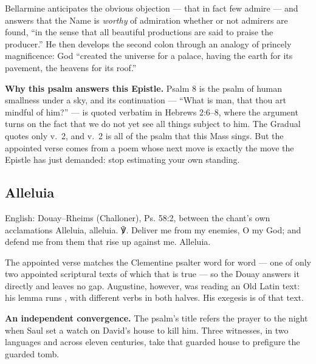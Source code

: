 \begin{witnessnote}
Bellarmine anticipates the obvious objection --- that in fact few admire ---
and answers that the Name is \textit{worthy} of admiration whether or not
admirers are found, ``in the sense that all beautiful productions are said to
praise the producer.'' He then develops the second colon through an analogy of
princely magnificence: God ``created the universe for a palace, having the
earth for its pavement, the heavens for its roof.''
\end{witnessnote}

\textbf{Why this psalm answers this Epistle.} Psalm 8 is the psalm of human
smallness under a sky, and its continuation --- ``What is man, that thou art
mindful of him?'' --- is quoted verbatim in Hebrews 2:6--8, where the argument
turns on the fact that we do not yet see all things subject to him. The
Gradual quotes only v.~2, and v.~2 is all of the psalm that this Mass sings.
But the appointed verse comes from a poem whose next move is exactly
the move the Epistle has just demanded: stop estimating your own standing.

\elementguard
\subsection*{Alleluia }


\begin{namedtranslation}{English: Douay--Rheims (Challoner), Ps. 58:2, between the chant's own  acclamations}
Alleluia, alleluia. ℣. Deliver me from my enemies, O my God; and defend me
from them that rise up against me. Alleluia.
\end{namedtranslation}

The appointed verse matches the Clementine psalter word for word --- one of
only two appointed scriptural texts of which that is true --- so the Douay
answers it directly and leaves no gap. Augustine, however, was
reading an Old Latin text: his lemma runs , with different verbs in
both halves. His exegesis is of that text.

\textbf{An independent convergence.} The psalm's title
refers the prayer to the night when Saul set a watch on David's house to kill
him. Three witnesses, in two languages and across eleven centuries, take that
guarded house to prefigure the guarded tomb.


